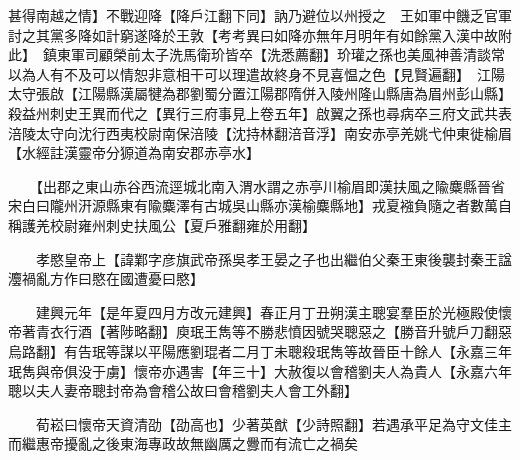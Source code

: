 甚得南越之情】不戰迎降【降戶江翻下同】訥乃避位以州授之　王如軍中饑乏官軍討之其黨多降如計窮遂降於王敦【考考異曰如降亦無年月明年有如餘黨入漢中故附此】　鎮東軍司顧榮前太子洗馬衛玠皆卒【洗悉薦翻】玠瓘之孫也美風神善清談常以為人有不及可以情恕非意相干可以理遣故終身不見喜愠之色【見賢遍翻】　江陽太守張啟【江陽縣漢屬犍為郡劉蜀分置江陽郡隋併入陵州隆山縣唐為眉州彭山縣】殺益州刺史王異而代之【異行三府事見上卷五年】啟翼之孫也尋病卒三府文武共表涪陵太守向沈行西夷校尉南保涪陵【沈持林翻涪音浮】南安赤亭羌姚弋仲東徙榆眉【水經註漢靈帝分獂道為南安郡赤亭水】

　　【出郡之東山赤谷西流逕城北南入渭水謂之赤亭川榆眉即漢扶風之隃麋縣晉省宋白曰隴州汧源縣東有隃麋澤有古城吳山縣亦漢榆麋縣地】戎夏襁負隨之者數萬自稱護羌校尉雍州刺史扶風公【夏戶雅翻雍於用翻】

　　孝愍皇帝上【諱鄴字彦旗武帝孫吳孝王晏之子也出繼伯父秦王東後襲封秦王諡灋禍亂方作曰愍在國遭憂曰愍】

　　建興元年【是年夏四月方改元建興】春正月丁丑朔漢主聰宴羣臣於光極殿使懷帝著青衣行酒【著陟略翻】庾珉王雋等不勝悲憤因號哭聰惡之【勝音升號戶刀翻惡烏路翻】有告珉等謀以平陽應劉琨者二月丁未聰殺珉雋等故晉臣十餘人【永嘉三年珉雋與帝俱没于虜】懷帝亦遇害【年三十】大赦復以會稽劉夫人為貴人【永嘉六年聰以夫人妻帝聰封帝為會稽公故曰會稽劉夫人會工外翻】

　　荀崧曰懷帝天資清劭【劭高也】少著英猷【少詩照翻】若遇承平足為守文佳主而繼惠帝擾亂之後東海專政故無幽厲之釁而有流亡之禍矣

